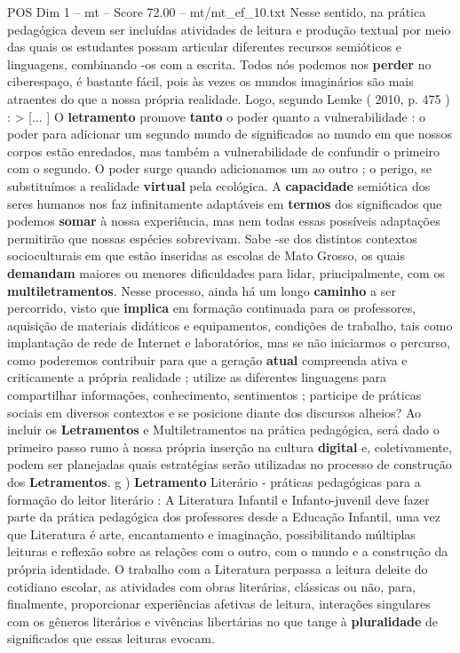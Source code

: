 \begin{textsample}{POS Dim 1 – mt – Score 72.00 – mt/mt\_ef\_10.txt}
Nesse sentido, na prática pedagógica devem ser incluídas atividades de leitura e produção textual por meio das quais os estudantes possam articular diferentes recursos semióticos e linguagens, combinando -os com a escrita.
Todos nós podemos nos \textbf{perder} no ciberespaço, é bastante fácil, pois às vezes os mundos imaginários são mais atraentes do que a nossa própria realidade.
Logo, segundo Lemke ( 2010, p. 475 ) : > [... ] O \textbf{letramento} promove \textbf{tanto} o poder quanto a vulnerabilidade : o poder para adicionar um segundo mundo de significados ao mundo em que nossos corpos estão enredados, mas também a vulnerabilidade de confundir o primeiro com o segundo.
O poder surge quando adicionamos um ao outro ; o perigo, se substituímos a realidade \textbf{virtual} pela ecológica.
A \textbf{capacidade} semiótica dos seres humanos nos faz infinitamente adaptáveis em \textbf{termos} dos significados que podemos \textbf{somar} à nossa experiência, mas nem todas essas possíveis adaptações permitirão que nossas espécies sobrevivam.
Sabe -se dos distintos contextos socioculturais em que estão inseridas as escolas de Mato Grosso, os quais \textbf{demandam} maiores ou menores dificuldades para lidar, principalmente, com os \textbf{multiletramentos}.
Nesse processo, ainda há um longo \textbf{caminho} a ser percorrido, visto que \textbf{implica} em formação continuada para os professores, aquisição de materiais didáticos e equipamentos, condições de trabalho, tais como implantação de rede de Internet e laboratórios, mas se não iniciarmos o percurso, como poderemos contribuir para que a geração \textbf{atual} compreenda ativa e criticamente a própria realidade ; utilize as diferentes linguagens para compartilhar informações, conhecimento, sentimentos ; participe de práticas sociais em diversos contextos e se posicione diante dos discursos alheios?
Ao incluir os \textbf{Letramentos} e Multiletramentos na prática pedagógica, será dado o primeiro passo rumo à nossa própria inserção na cultura \textbf{digital} e, coletivamente, podem ser planejadas quais estratégias serão utilizadas no processo de construção dos \textbf{Letramentos}. g ) \textbf{Letramento} Literário - práticas pedagógicas para a formação do leitor literário : A Literatura Infantil e Infanto-juvenil deve fazer parte da prática pedagógica dos professores desde a Educação Infantil, uma vez que Literatura é arte, encantamento e imaginação, possibilitando múltiplas leituras e reflexão sobre as relações com o outro, com o mundo e a construção da própria identidade.
O trabalho com a Literatura perpassa a leitura deleite do cotidiano escolar, as atividades com obras literárias, clássicas ou não, para, finalmente, proporcionar experiências afetivas de leitura, interações singulares com os gêneros literários e vivências libertárias no que tange à \textbf{pluralidade} de significados que essas leituras evocam.

\end{textsample}
